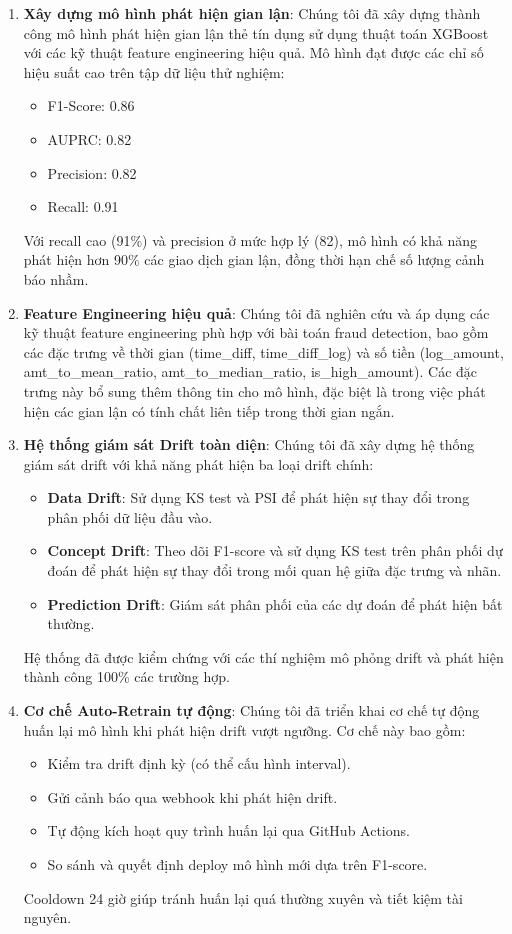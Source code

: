 \begin{enumerate}
    \item \textbf{Xây dựng mô hình phát hiện gian lận}: Chúng tôi đã xây dựng thành công mô hình phát hiện gian lận thẻ tín dụng sử dụng thuật toán XGBoost với các kỹ thuật feature engineering hiệu quả. Mô hình đạt được các chỉ số hiệu suất cao trên tập dữ liệu thử nghiệm:
    \begin{itemize}
        \item F1-Score: 0.86
        \item AUPRC: 0.82
        \item Precision: 0.82
        \item Recall: 0.91
    \end{itemize}
    Với recall cao (91\%) và precision ở mức hợp lý (82), mô hình có khả năng phát hiện hơn 90\% các giao dịch gian lận, đồng thời hạn chế số lượng cảnh báo nhầm.
    
    \item \textbf{Feature Engineering hiệu quả}: Chúng tôi đã nghiên cứu và áp dụng các kỹ thuật feature engineering phù hợp với bài toán fraud detection, bao gồm các đặc trưng về thời gian (time\_diff, time\_diff\_log) và số tiền (log\_amount, amt\_to\_mean\_ratio, amt\_to\_median\_ratio, is\_high\_amount). Các đặc trưng này bổ sung thêm thông tin cho mô hình, đặc biệt là trong việc phát hiện các gian lận có tính chất liên tiếp trong thời gian ngắn.
    
    \item \textbf{Hệ thống giám sát Drift toàn diện}: Chúng tôi đã xây dựng hệ thống giám sát drift với khả năng phát hiện ba loại drift chính:
    \begin{itemize}
        \item \textbf{Data Drift}: Sử dụng KS test và PSI để phát hiện sự thay đổi trong phân phối dữ liệu đầu vào.
        \item \textbf{Concept Drift}: Theo dõi F1-score và sử dụng KS test trên phân phối dự đoán để phát hiện sự thay đổi trong mối quan hệ giữa đặc trưng và nhãn.
        \item \textbf{Prediction Drift}: Giám sát phân phối của các dự đoán để phát hiện bất thường.
    \end{itemize}
    Hệ thống đã được kiểm chứng với các thí nghiệm mô phỏng drift và phát hiện thành công 100\% các trường hợp.
    
    \item \textbf{Cơ chế Auto-Retrain tự động}: Chúng tôi đã triển khai cơ chế tự động huấn lại mô hình khi phát hiện drift vượt ngưỡng. Cơ chế này bao gồm:
    \begin{itemize}
        \item Kiểm tra drift định kỳ (có thể cấu hình interval).
        \item Gửi cảnh báo qua webhook khi phát hiện drift.
        \item Tự động kích hoạt quy trình huấn lại qua GitHub Actions.
        \item So sánh và quyết định deploy mô hình mới dựa trên F1-score.
    \end{itemize}
    Cooldown 24 giờ giúp tránh huấn lại quá thường xuyên và tiết kiệm tài nguyên.
    

\end{enumerate}
